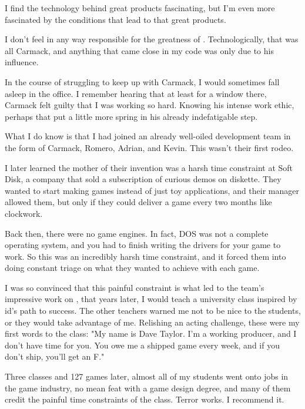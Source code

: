 I find the technology behind great products fascinating, but I'm even more fascinated by the conditions that lead to that great products.\\
\par
I don't feel in any way responsible for the greatness of \doom{}.  Technologically, that was all Carmack, and anything that came close in my code was only due to his influence.\\
\par
In the course of struggling to keep up with Carmack, I would sometimes fall asleep in the office.  I remember hearing that at least for a window there, Carmack felt guilty that I was working so hard.  Knowing his intense work ethic, perhaps that put a little more spring in his already indefatigable step.\\
\par
What I do know is that I had joined an already well-oiled development team in the form of Carmack, Romero, Adrian, and Kevin.  This wasn't their first rodeo.\\
\par
I later learned the mother of their invention was a harsh time constraint at Soft Disk, a company that sold a subscription of curious demos on diskette.  They wanted to start making games instead of just toy applications, and their manager allowed them, but only if they could deliver a game every two months like clockwork.\\
\par
Back then, there were no game engines.  In fact, DOS was not a complete operating system, and you had to finish writing the drivers for your game to work.  So this was an incredibly harsh time constraint, and it forced them into doing constant triage on what they wanted to achieve with each game.\\
\par
I was so convinced that this painful constraint is what led to the team's impressive work on \doom{}, that years later, I would teach a university class inspired by id's path to success.  The other teachers warned me not to be nice to the students, or they would take advantage of me.  Relishing an acting challenge, these were my first words to the class: "My name is Dave Taylor.  I'm a working producer, and I don't have time for you.  You owe me a shipped game every week, and if you don't ship, you'll get an F."\\
\par
Three classes and 127 games later, almost all of my students went onto jobs in the game industry, no mean feat with a game design degree, and many of them credit the painful time constraints of the class.  Terror works.  I recommend it.\\
